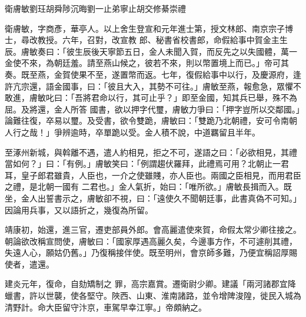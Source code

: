 
\begin{pinyinscope}

 衛膚敏劉玨胡舜陟沉晦劉一止弟寧止胡交修綦崇禮



 衛膚敏，字商彥，華亭人。以上舍生登宣和元年進士第，授文林郎、南京宗子博士，尋改教授。六年，召對，改宣教
 郎、秘書省校書郎，命假給事中賀金主生辰。膚敏奏曰：「彼生辰後天寧節五日，金人未聞入賀，而反先之以失國體，萬一金使不來，為朝廷羞。請至燕山候之，彼若不來，則以幣置境上而已。」帝可其奏。既至燕，金賀使果不至，遂置幣而返。七年，復假給事中以行，及慶源府，逢許亢宗還，語金國事，曰：「彼且大入，其勢不可往。」膚敏至燕，報愈急，眾懼不敢進，膚敏叱曰：「吾將君命以行，其可止乎？」即至金國，知其兵已舉，殊不為屈。及將還，金人所答
 國書，欲以押字代璽，膚敏力爭曰：「押字豈所以交鄰國。」論難往復，卒易以璽。及受書，欲令雙跪，膚敏曰：「雙跪乃北朝禮，安可令南朝人行之哉！」爭辨逾時，卒單跪以受。金人積不說，中道羈留且半年。



 至涿州新城，與斡離不遇，遣人約相見，拒之不可，遂語之曰：「必欲相見，其禮當如何？」曰：「有例。」膚敏笑曰：「例謂趨伏羅拜，此禮焉可用？北朝止一君耳，皇子郎君雖貴，人臣也，一介之使雖賤，亦人臣也。兩國之臣相見，而用君臣之禮，是北朝一國有
 二君也。」金人氣折，始曰：「唯所欲。」膚敏長揖而入。既坐，金人出誓書示之，膚敏卻不視，曰：「遠使久不聞朝廷事，此書真偽不可知。」因論用兵事，又以語折之，幾復為所留。



 靖康初，始還，進三官，遷吏部員外郎。會高麗遣使來賀，命假太常少卿往接之。朝論欲改稱宣問使，膚敏曰：「國家厚遇高麗久矣，今邊事方作，不可遽削其禮，失遠人心，願姑仍舊。」乃復稱接伴使。既至明州，會京師多難，乃便宜稱詔厚賜使者，遣還。



 建炎元年，復命，自劾矯制之
 罪，高宗嘉賞。遷衛尉少卿。建議「兩河諸郡宜降蠟書，許以世襲，使各堅守。陜西、山東、淮南諸路，並令增陴浚隍，徙民入城為清野計。命大臣留守汴京，車駕早幸江寧。」帝頗納之。




\end{pinyinscope}
